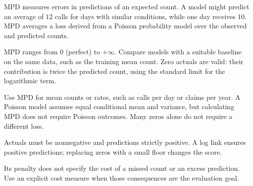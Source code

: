 \metricend
\clearpage
\thispagestyle{regressionstyle}
\label{sec:mpd}

MPD measures errors in predictions of an expected count. A model might predict an average of $12$ calls for days with similar conditions, while one day receives $10$. MPD averages a loss derived from a Poisson probability model over the observed and predicted counts.

\begin{metricformula}
\end{metricformula}

MPD ranges from $0$ (perfect) to $+\infty$. Compare models with a suitable baseline on the same data, such as the training mean count. Zero actuals are valid: their contribution is twice the predicted count, using the standard limit for the logarithmic term.


Use MPD for mean counts or rates, such as calls per day or claims per year. A Poisson model assumes equal conditional mean and variance, but calculating MPD does not require Poisson outcomes. Many zeros alone do not require a different loss.

{
    \item Actuals must be nonnegative and predictions strictly positive. A log link ensures positive predictions; replacing zeros with a small floor changes the score.
    \item Its penalty does not specify the cost of a missed count or an excess prediction. Use an explicit cost measure when those consequences are the evaluation goal.
}

